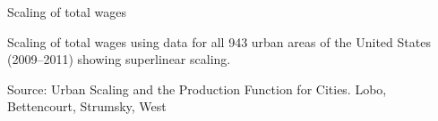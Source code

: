 \documentclass[]{beamer} %
\begin{document}
\begin{frame}{Scaling of total wages}

\vspace{-.3cm}
\small Scaling of total wages using data for all 943 urban areas of the United States (2009–2011) showing superlinear scaling.

\vspace{.1cm}
\tiny Source: Urban Scaling and the Production Function for Cities. Lobo, Bettencourt, Strumsky, West
\end{frame}





\end{document}

